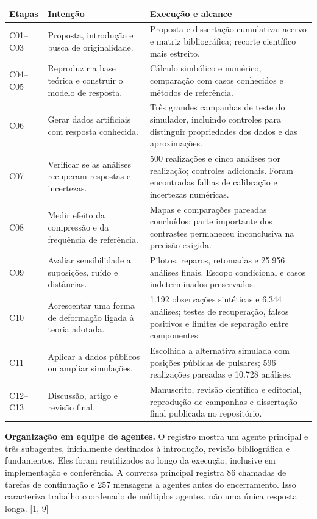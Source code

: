 \documentclass[11pt,a4paper]{article}
\newcommand{\fonte}[1]{{\small\color{navy}[#1]}}
\begin{document}
\begin{tabularx}{\textwidth}{@{}p{1.6cm}Y Y@{}}
\toprule
\textbf{Etapas} & \textbf{Intenção} & \textbf{Execução e alcance}\\
\midrule
C01--C03 & Proposta, introdução e busca de originalidade. & Proposta e dissertação cumulativa; acervo e matriz bibliográfica; recorte científico mais estreito.\\
C04--C05 & Reproduzir a base teórica e construir o modelo de resposta. & Cálculo simbólico e numérico, comparação com casos conhecidos e métodos de referência.\\
C06 & Gerar dados artificiais com resposta conhecida. & Três grandes campanhas de teste do simulador, incluindo controles para distinguir propriedades dos dados e das aproximações.\\
C07 & Verificar se as análises recuperam respostas e incertezas. & 500 realizações e cinco análises por realização; controles adicionais. Foram encontradas falhas de calibração e incertezas numéricas.\\
C08 & Medir efeito da compressão e da frequência de referência. & Mapas e comparações pareadas concluídos; parte importante dos contrastes permaneceu inconclusiva na precisão exigida.\\
C09 & Avaliar sensibilidade a suposições, ruído e distâncias. & Pilotos, reparos, retomadas e 25.956 análises finais. Escopo condicional e casos indeterminados preservados.\\
C10 & Acrescentar uma forma de deformação ligada à teoria adotada. & 1.192 observações sintéticas e 6.344 análises; testes de recuperação, falsos positivos e limites de separação entre componentes.\\
C11 & Aplicar a dados públicos ou ampliar simulações. & Escolhida a alternativa simulada com posições públicas de pulsares; 596 realizações pareadas e 10.728 análises.\\
C12--C13 & Discussão, artigo e revisão final. & Manuscrito, revisão científica e editorial, reprodução de campanhas e dissertação final publicada no repositório.\\
\bottomrule
\end{tabularx}

\textbf{Organização em equipe de agentes.} O registro mostra um agente principal e três subagentes, inicialmente destinados à introdução, revisão bibliográfica e fundamentos. Eles foram reutilizados ao longo da execução, inclusive em implementação e conferência. A conversa principal registra 86 chamadas de tarefas de continuação e 257 mensagens a agentes antes do encerramento. Isso caracteriza trabalho coordenado de múltiplos agentes, não uma única resposta longa. \fonte{1, 9}
\end{document}
